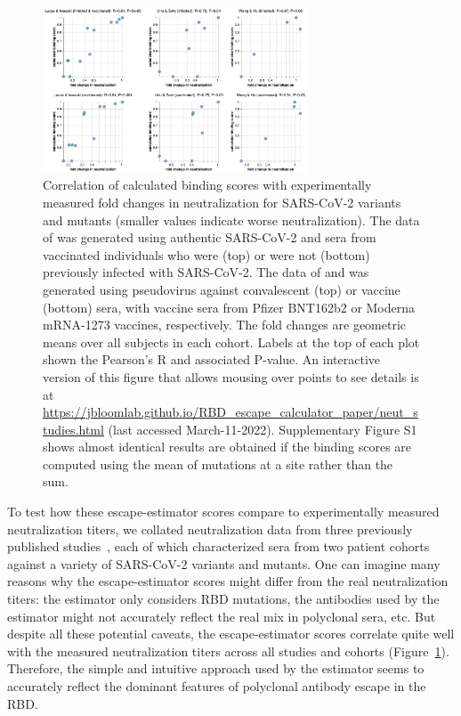 \documentclass[9pt,twocolumn,twoside]{gsajnl_modified}
\begin{document}
\begin{figure}
\includegraphics[width=0.7\textwidth]{../results/neut_studies/neut_studies.png}
\caption{Correlation of calculated binding scores with experimentally measured fold changes in neutralization for SARS-CoV-2 variants and mutants (smaller values indicate worse neutralization).
The data of \citet{lucas2021impact} was generated using authentic SARS-CoV-2 and sera from vaccinated individuals who were (top) or were not (bottom) previously infected with SARS-CoV-2.
The data of \citet{uriu2021neutralization} and \citet{wang2021antibody} was generated using pseudovirus against convalescent (top) or vaccine (bottom) sera, with vaccine sera from Pfizer BNT162b2 or Moderna mRNA-1273 vaccines, respectively. 
The fold changes are geometric means over all subjects in each cohort.
Labels at the top of each plot shown the Pearson's R and associated P-value.
An interactive version of this figure that allows mousing over points to see details is at \url{https://jbloomlab.github.io/RBD_escape_calculator_paper/neut_studies.html} (last accessed March-11-2022).
Supplementary Figure S1 shows almost identical results are obtained if the binding scores are computed using the mean of mutations at a site rather than the sum.
}
\label{fig:neut_studies}
\end{figure}

To test how these escape-estimator scores compare to experimentally measured neutralization titers, we collated neutralization data from three previously published studies~\citep{lucas2021impact,uriu2021neutralization,wang2021antibody}, each of which characterized sera from two patient cohorts against a variety of SARS-CoV-2 variants and mutants.
One can imagine many reasons why the escape-estimator scores might differ from the real neutralization titers: the estimator only considers RBD mutations, the antibodies used by the estimator might not accurately reflect the real mix in polyclonal sera, etc.
But despite all these potential caveats, the escape-estimator scores correlate quite well with the measured neutralization titers across all studies and cohorts (Figure~\ref{fig:neut_studies}).
Therefore, the simple and intuitive approach used by the estimator seems to accurately reflect the dominant features of polyclonal antibody escape in the RBD.
\end{document}
